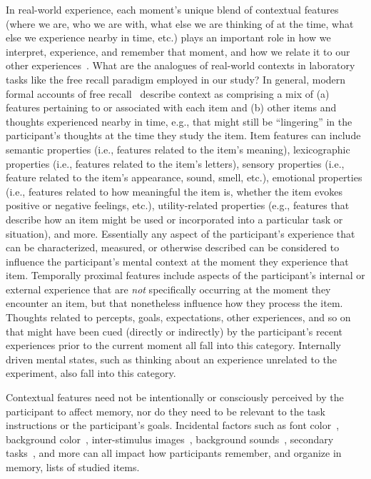 \documentclass[11pt]{article}
\begin{document}
In real-world experience, each moment's unique blend of contextual features
(where we are, who we are with, what else we are thinking of at the time, what
else we experience nearby in time, etc.) plays an important role in how we
interpret, experience, and remember that moment, and how we relate it to our
other experiences~\citep[e.g., for review see ][]{Mann20}. What are the
analogues of real-world contexts in laboratory tasks like the free recall
paradigm employed in our study? In general, modern formal accounts of free
recall~\citep{Kaha20} describe context as comprising a mix of (a) features
pertaining to or associated with each item and (b) other items and thoughts
experienced nearby in time, e.g., that might still be ``lingering'' in the
participant's thoughts at the time they study the item. Item features can
include semantic properties (i.e., features related to the item's meaning),
lexicographic properties (i.e., features related to the item's letters),
sensory properties (i.e., feature related to the item's appearance, sound,
smell, etc.), emotional properties (i.e., features related to how meaningful the
item is, whether the item evokes positive or negative feelings, etc.),
utility-related properties (e.g., features that describe how an item might be
used or incorporated into a particular task or situation), and more.
Essentially any aspect of the participant's experience that can be
characterized, measured, or otherwise described can be considered to influence
the participant's mental context at the moment they experience that item.
Temporally proximal features include aspects of the participant's internal or
external experience that are \textit{not} specifically occurring at the moment
they encounter an item, but that nonetheless influence how they process the
item. Thoughts related to percepts, goals, expectations, other experiences, and
so on that might have been cued (directly or indirectly) by the participant's
recent experiences prior to the current moment all fall into this category.
Internally driven mental states, such as thinking about an experience unrelated
to the experiment, also fall into this category.

Contextual features need not be intentionally or consciously perceived by the
participant to affect memory, nor do they need to be relevant to the task
instructions or the participant's goals. Incidental factors such as font
color~\citep{JonePyc14}, background color~\citep{IsarIsar07}, inter-stimulus
images~\citep{GersEtal13, MannEtal16, ChiuEtal21}, background
sounds~\citep{BeamJone10, SahaSmit14}, secondary tasks~\citep{MasiSaha14,
PolyEtal09, OberLewa08}, and more can all impact how participants remember, and
organize in memory, lists of studied items.
\end{document}
